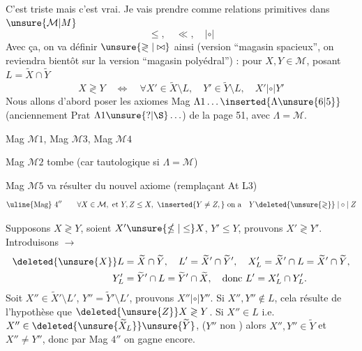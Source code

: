 C'est triste mais c'est vrai.
Je vais prendre comme relations primitives dans $\unsure{\mathcal M|M}$
\[
\leq,\quad\ll,\quad\mathrel{|\circ|}
\]
Avec ça, on va définir $\unsure{\gtrless|\bowtie}$ ainsi (version  ``magasin spacieux'', on reviendra bientôt sur la version ``magasin polyédral'') : pour $X,Y\in\mathcal M$, posant $L=\widetilde X\cap\widetilde Y$ 
\[
X\gtrless Y\quad\Longleftrightarrow\quad\forall X'\in\widetilde X\setminus L,\quad Y'\in\widetilde Y\setminus L,\quad X'\mathrel{|\circ|}Y'
\]
Nous allons d'abord poser les axiomes Mag $\Lambda1\ldots\inserted{\Lambda\unsure{6|5}}$ (anciennement Prat $\Lambda1\unsure{\text{?}|\S}\ldots$) de la page 51, avec $\Lambda=\mathcal M$.

Mag $\mathcal M1$, Mag $\mathcal M3$, Mag $\mathcal M4$  

Mag $\mathcal M2$ tombe (car  tautologique si $\Lambda=\mathcal M$)

Mag $\mathcal M5$  va résulter du nouvel axiome (remplaçant At L3)
\[
\text{\uline{Mag} }4''\qquad\forall X\in\mathcal M,\ \text{et }Y,Z\leq X,\ \inserted{Y\ne Z,}\ \text{on a}\quad Y\deleted{\unsure{\gtrless}}\mathrel{|\circ|}Z
\]

Supposons $X\gtrless Y$, soient $X'\unsure{\nleq|\leq}X$, $Y'\leq Y$, prouvons $X'\gtrless Y'$. Introduisons $\longrightarrow$
\[
\begin{aligned}
\deleted{\unsure{X}}L&=\widetilde X\cap\widetilde Y,\quad L'=\widetilde X'\cap\widetilde Y',\quad X'_L=\widetilde X'\cap L=\widetilde X'\cap\widetilde Y,\\
Y'_L&=\widetilde Y'\cap L=\widetilde Y'\cap\widetilde X,\quad\text{donc }L'=X'_L\cap Y'_L.
\end{aligned}
\]
Soit $X''\in\widetilde X'\setminus L'$, $Y''=\widetilde Y'\setminus L'$, prouvons $X''\mathrel{|\circ|}Y''$. Si $X'',Y''\notin L$, cela résulte de l'hypothèse que $\deleted{\unsure{Z}}X\gtrless Y$. Si $X''\in L$ i.e. $X''\in\deleted{\unsure{\widetilde X_L}}\unsure{\widetilde Y}$, ($Y''$ non ) alors $X'',Y''\in\widetilde Y$ et $X''\ne Y''$, donc par Mag $4''$ on gagne encore.

